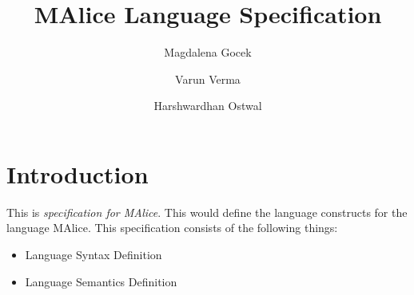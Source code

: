 \documentclass[a4wide, 11pt]{article}
\begin{document}
\title{MAlice Language Specification}

\author{Magdalena Gocek \and Varun Verma \and Harshwardhan Ostwal}

\maketitle            %

\section{Introduction}
\label{sec:intro}
This is \emph{specification for MAlice}. This would define the language
constructs for the language MAlice. This specification consists of
the following things:
\begin{itemize}
	\item Language Syntax Definition
	\item Language Semantics Definition
\end{itemize}


\end{document}
